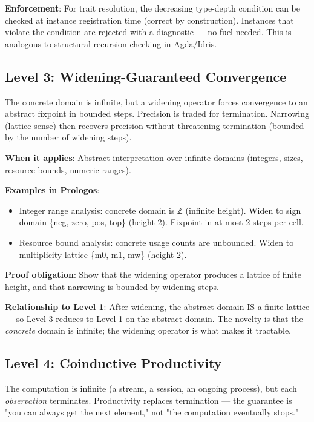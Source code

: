 \documentclass[11pt]{article}
\begin{document}
\textbf{Enforcement}: For trait resolution, the decreasing type-depth
condition can be checked at instance registration time (correct by
construction). Instances that violate the condition are rejected with
a diagnostic --- no fuel needed. This is analogous to structural
recursion checking in Agda/Idris.
\subsection{Level 3: Widening-Guaranteed Convergence}
\label{sec:orge06f5b6}

The concrete domain is infinite, but a widening operator forces
convergence to an abstract fixpoint in bounded steps. Precision is
traded for termination. Narrowing (lattice sense) then recovers
precision without threatening termination (bounded by the number of
widening steps).

\textbf{When it applies}: Abstract interpretation over infinite domains
(integers, sizes, resource bounds, numeric ranges).

\textbf{Examples in Prologos}:
\begin{itemize}
\item Integer range analysis: concrete domain is ℤ (infinite height).
Widen to sign domain \{neg, zero, pos, top\} (height 2). Fixpoint
in at most 2 steps per cell.
\item Resource bound analysis: concrete usage counts are unbounded. Widen
to multiplicity lattice \{m0, m1, mw\} (height 2).
\end{itemize}

\textbf{Proof obligation}: Show that the widening operator produces a lattice
of finite height, and that narrowing is bounded by widening steps.

\textbf{Relationship to Level 1}: After widening, the abstract domain IS a
finite lattice --- so Level 3 reduces to Level 1 on the abstract
domain. The novelty is that the \emph{concrete} domain is infinite; the
widening operator is what makes it tractable.
\subsection{Level 4: Coinductive Productivity}
\label{sec:org46cfe20}

The computation is infinite (a stream, a session, an ongoing process),
but each \emph{observation} terminates. Productivity replaces termination
--- the guarantee is "you can always get the next element," not "the
computation eventually stops."
\end{document}
